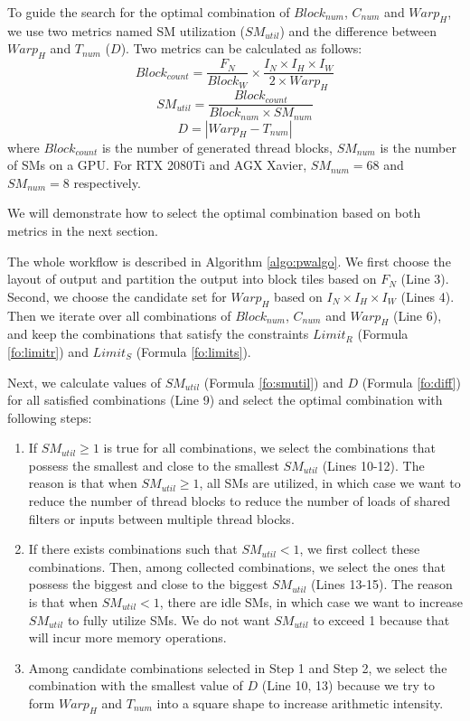 To guide the search for the optimal combination of $Block_{num}$, $C_{num}$ and $Warp_H$, we use two metrics named SM utilization ($SM_{util}$) and the difference between $Warp_H$ and $T_{num}$ ($D$).
Two metrics can be calculated as follows:
\begin{equation}\nonumber
    Block_{count}=\frac{F_N}{Block_W} \times \frac{I_N \times I_H \times I_W}{2 \times Warp_H}
\end{equation}
\begin{equation}
    SM_{util}=\frac{Block_{count}}{Block_{num}\times SM_{num}}
    \label{fo:smutil}
\end{equation}
\begin{equation}
    D = |Warp_H-T_{num}|
    \label{fo:diff}
\end{equation}
where $Block_{count}$ is the number of generated thread blocks, $SM_{num}$ is the number of SMs on a GPU. For RTX 2080Ti and AGX Xavier, $SM_{num}=68$ and $SM_{num}=8$ respectively.

We will demonstrate how to select the optimal combination based on both metrics in the next section.


The whole workflow is described in Algorithm \ref{algo:pwalgo}.
We first choose the layout of output and partition the output into block tiles based on $F_N$ (Line 3).
Second, we choose the candidate set for $Warp_H$ based on $I_N \times I_H \times I_W$ (Lines 4).
Then we iterate over all combinations of $Block_{num}$, $C_{num}$ and $Warp_H$ (Line 6), and keep the combinations that satisfy the constraints $Limit_R$ (Formula \ref{fo:limitr}) and $Limit_S$ (Formula \ref{fo:limits}).

Next, we calculate values of $SM_{util}$ (Formula \ref{fo:smutil}) and $D$ (Formula \ref{fo:diff}) for all satisfied combinations (Line 9) and select the optimal combination with following steps:
\begin{enumerate}[Step 1]
    \item If $SM_{util} \geq 1$ is true for all combinations, we select the combinations that possess the smallest and close to the smallest $SM_{util}$ (Lines 10-12).
    The reason is that when $SM_{util} \geq 1$, all SMs are utilized, in which case we want to reduce the number of thread blocks to reduce the number of loads of shared filters or inputs between multiple thread blocks.
    \item If there exists combinations such that $SM_{util}<1$, we first collect these combinations. Then, among collected combinations, we select the ones that possess the biggest and close to the biggest $SM_{util}$ (Lines 13-15).
    The reason is that when $SM_{util}<1$, there are idle SMs, in which case we want to increase $SM_{util}$ to fully utilize SMs. We do not want $SM_{util}$ to exceed 1 because that will incur more memory operations.
    \item Among candidate combinations selected in Step 1 and Step 2, we select the combination with the smallest value of $D$ (Line 10, 13) because we try to form $Warp_H$ and $T_{num}$ into a square shape to increase arithmetic intensity.
\end{enumerate}

